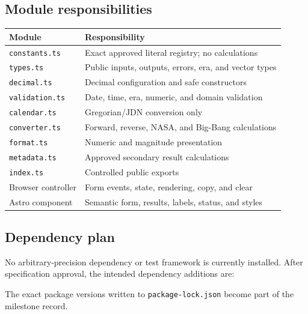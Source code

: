\documentclass[11pt,letterpaper]{article}
\newcommand{\filepath}[1]{\texttt{#1}}
\begin{document}
\subsection{Module responsibilities}

\begin{tabularx}{\textwidth}{L{1.65in}Y}
\toprule
\textbf{Module} & \textbf{Responsibility} \\
\midrule
\texttt{constants.ts} & Exact approved literal registry; no calculations \\
\texttt{types.ts} & Public inputs, outputs, errors, era, and vector types \\
\texttt{decimal.ts} & Decimal configuration and safe constructors \\
\texttt{validation.ts} & Date, time, era, numeric, and domain validation \\
\texttt{calendar.ts} & Gregorian/JDN conversion only \\
\texttt{converter.ts} & Forward, reverse, NASA, and Big-Bang calculations \\
\texttt{format.ts} & Numeric and magnitude presentation \\
\texttt{metadata.ts} & Approved secondary result calculations \\
\texttt{index.ts} & Controlled public exports \\
Browser controller & Form events, state, rendering, copy, and clear \\
Astro component & Semantic form, results, labels, status, and styles \\
\bottomrule
\end{tabularx}

\subsection{Dependency plan}

No arbitrary-precision dependency or test framework is currently installed.
After specification approval, the intended dependency additions are:


The exact package versions written to \filepath{package-lock.json} become part
of the milestone record.
\end{document}
